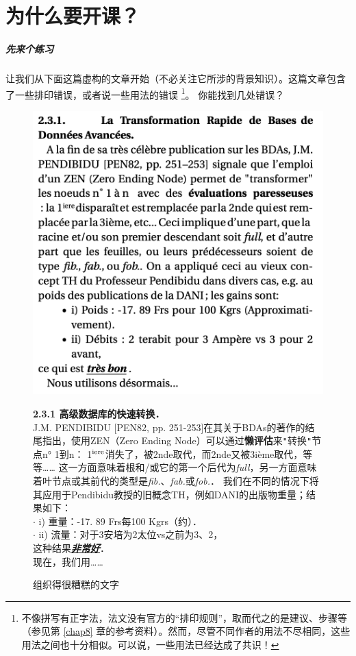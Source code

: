 \chapter{为什么要开课？}

\paragraph*{先来个练习}让我们从下面这篇虚构的文章开始（不必关注它所涉的背景知识）。这篇文章包含了一些排印错误，或者说一些用法的错误 
    \footnote{不像拼写有正字法，法文没有官方的“排印规则”，取而代之的是建议、步骤等（参见第 \ref{chap8} 章的参考资料）。然而，尽管不同作者的用法不尽相同，这些用法之间也十分相似。可以说，一些用法已经达成了共识！}。
你能找到几处错误？

\begin{figure}
    \centering
    \includegraphics[width = \linewidth]{img/1.png}

\begin{mdframed}
    \footnotesize
    \textbf{2.3.1 \quad 高级数据库的快速转换．}\\
    J.M. PENDIBIDU [PEN82, pp. 251-253]在其关于BDAs的著作的结尾指出，使用ZEN（Zero Ending Node）可以通过\textbf{懒评估}来\verb|"|转换\verb|"|节点n° 1到n：
    1$^{\rm iere}$消失了，被2nde取代，而2nde又被3ième取代，等等……
    这一方面意味着根和/或它的第一个后代为\emph{full}，另一方面意味着叶节点或其前代的类型是\emph{fib.}、\emph{fab.}或\emph{fob.}．
    我们在不同的情况下将其应用于Pendibidu教授的旧概念TH，例如DANI的出版物重量；结果如下：\\
    $\cdot$ i) 重量：-17. 89 Frs每100 Kgrs（约）．\\
    $\cdot$ ii) 流量：对于3安培为2太位vs之前为3、2，\\
    这种结果\textbf{\emph{\underline{非常好}}}．\\
    现在，我们用……
\end{mdframed}

    \caption{组织得很糟糕的文字}
    \label{fig1}
\end{figure}

